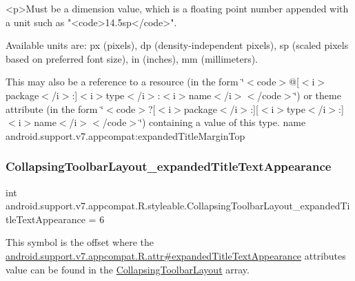 \begin{DoxyVerb}      <p>Must be a dimension value, which is a floating point number appended with a unit such as "<code>14.5sp</code>".
\end{DoxyVerb}
 Available units are\+: px (pixels), dp (density-\/independent pixels), sp (scaled pixels based on preferred font size), in (inches), mm (millimeters). 

This may also be a reference to a resource (in the form \char`\"{}$<$code$>$@\mbox{[}$<$i$>$package$<$/i$>$\+:\mbox{]}$<$i$>$type$<$/i$>$\+:$<$i$>$name$<$/i$>$$<$/code$>$\char`\"{}) or theme attribute (in the form \char`\"{}$<$code$>$?\mbox{[}$<$i$>$package$<$/i$>$\+:\mbox{]}\mbox{[}$<$i$>$type$<$/i$>$\+:\mbox{]}$<$i$>$name$<$/i$>$$<$/code$>$\char`\"{}) containing a value of this type.  name android.\+support.\+v7.\+appcompat\+:expanded\+Title\+Margin\+Top \mbox{\label{classandroid_1_1support_1_1v7_1_1appcompat_1_1R_1_1styleable_af1872845d84b104e9c1a63abd2fadcd0}} 
\subsubsection{\texorpdfstring{Collapsing\+Toolbar\+Layout\+\_\+expanded\+Title\+Text\+Appearance}{CollapsingToolbarLayout\_expandedTitleTextAppearance}}
{\footnotesize\ttfamily int android.\+support.\+v7.\+appcompat.\+R.\+styleable.\+Collapsing\+Toolbar\+Layout\+\_\+expanded\+Title\+Text\+Appearance = 6\hspace{0.3cm}{\ttfamily [static]}}

This symbol is the offset where the \hyperlink{classandroid_1_1support_1_1v7_1_1appcompat_1_1R_1_1attr_a6591a675d361c68a12e36dd6fcd3e05b}{android.\+support.\+v7.\+appcompat.\+R.\+attr\#expanded\+Title\+Text\+Appearance} attribute\textquotesingle{}s value can be found in the \hyperlink{classandroid_1_1support_1_1v7_1_1appcompat_1_1R_1_1styleable_a8d282d917f35e5a08dd37db243410383}{Collapsing\+Toolbar\+Layout} array.


